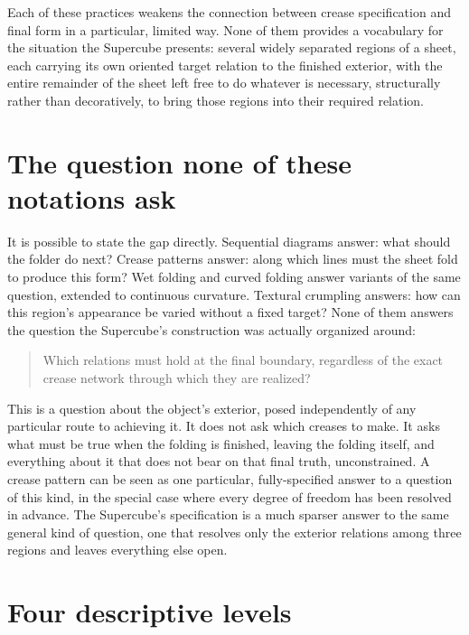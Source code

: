 \documentclass[11pt,oneside]{book}
\begin{document}
Each of these practices weakens the connection between crease
specification and final form in a particular, limited way. None of them
provides a vocabulary for the situation the Supercube presents: several
widely separated regions of a sheet, each carrying its own oriented
target relation to the finished exterior, with the entire remainder of
the sheet left free to do whatever is necessary, structurally rather
than decoratively, to bring those regions into their required relation.

\hypertarget{the-question-none-of-these-notations-ask}{%
\section{The question none of these notations
ask}\label{the-question-none-of-these-notations-ask}}

It is possible to state the gap directly. Sequential diagrams answer:
what should the folder do next? Crease patterns answer: along which
lines must the sheet fold to produce this form? Wet folding and curved
folding answer variants of the same question, extended to continuous
curvature. Textural crumpling answers: how can this region's appearance
be varied without a fixed target? None of them answers the question the
Supercube's construction was actually organized around:

\begin{quote}
Which relations must hold at the final boundary, regardless of the exact
crease network through which they are realized?
\end{quote}

This is a question about the object's exterior, posed independently of
any particular route to achieving it. It does not ask which creases to
make. It asks what must be true when the folding is finished, leaving
the folding itself, and everything about it that does not bear on that
final truth, unconstrained. A crease pattern can be seen as one
particular, fully-specified answer to a question of this kind, in the
special case where every degree of freedom has been resolved in advance.
The Supercube's specification is a much sparser answer to the same
general kind of question, one that resolves only the exterior relations
among three regions and leaves everything else open.

\hypertarget{four-descriptive-levels}{%
\section{Four descriptive levels}\label{four-descriptive-levels}}
\end{document}
